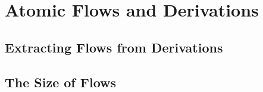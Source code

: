 \chapter{Atomic Flows and Derivations}

\section{Extracting Flows from Derivations}

\section{The Size of Flows}